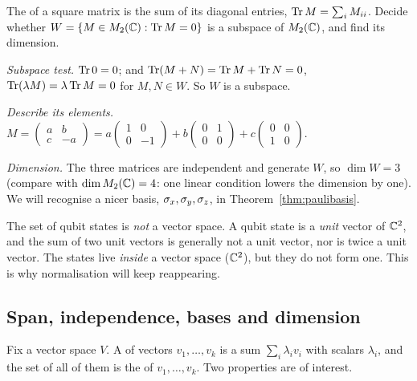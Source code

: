 \begin{example}\label{ex:trace-zero}
  The  of a square matrix is the sum of its diagonal entries, $\operatorname{Tr} M=\sum_iM_{ii}$. Decide whether $W=\{M\in M_2(\mathbb{C}):\operatorname{Tr} M=0\}$ is a subspace of $M_2(\mathbb{C})$, and find its dimension.
\end{example}
\begin{solution}
  \begin{steps}
    \item \emph{Subspace test.} $\operatorname{Tr}0=0$; and $\operatorname{Tr}(M+N)=\operatorname{Tr} M+\operatorname{Tr} N=0$, $\operatorname{Tr}(\lambda M)=\lambda\operatorname{Tr} M=0$ for $M,N\in W$. So $W$ is a subspace.
    \item \emph{Describe its elements.} $M=\begin{pmatrix}a&b\\c&-a\end{pmatrix}=a\begin{pmatrix}1&0\\0&-1\end{pmatrix}+b\begin{pmatrix}0&1\\0&0\end{pmatrix}+c\begin{pmatrix}0&0\\1&0\end{pmatrix}$.
    \item \emph{Dimension.} The three matrices are independent and generate $W$, so $\dim W=3$ (compare with $\dim M_2(\mathbb{C})=4$: one linear condition lowers the dimension by one). We will recognise a nicer basis, $\sigma_x,\sigma_y,\sigma_z$, in Theorem~\ref{thm:paulibasis}.
  \end{steps}
\end{solution}

\begin{pitfall}
  The set of qubit states is \emph{not} a vector space. A qubit state is a \emph{unit} vector of $\mathbb{C}^2$, and the sum of two unit vectors is generally not a unit vector, nor is twice a unit vector. The states live \emph{inside} a vector space ($\mathbb{C}^2$), but they do not form one. This is why normalisation will keep reappearing.
\end{pitfall}

\subsection{Span, independence, bases and dimension}

Fix a vector space $V$. A  of vectors $v_1,\dots,v_k$ is a sum $\sum_i\lambda_iv_i$ with scalars $\lambda_i$, and the set of all of them is the  of $v_1,\dots,v_k$. Two properties are of interest.

